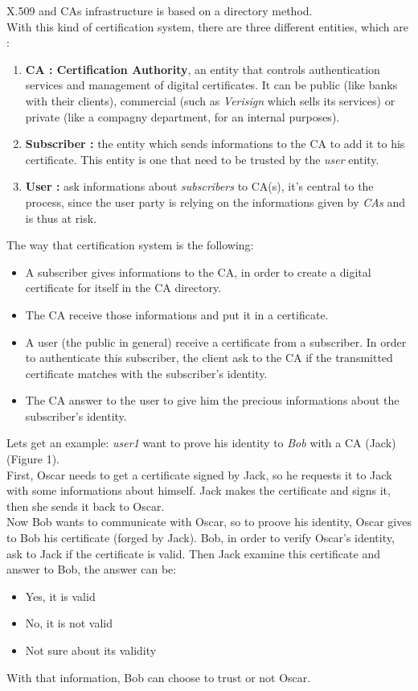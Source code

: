 \documentclass[journal, a4paper]{IEEEtran}
\begin{document}
X.509 and CAs\cite{rfc3647} infrastructure is based on a directory method.\\
With this kind of certification system, there are three different entities, which are :

\begin{enumerate}
	\item \textbf{CA : Certification Authority}, an entity that controls authentication services and management of digital certificates. It can be public (like banks with their clients), commercial (such as \textit{Verisign} which sells its services) or private (like a compagny department, for an internal purposes).
	\item \textbf{Subscriber :} the entity which sends informations to the CA to add it to his certificate. This entity is one that need to be trusted by the \textit{user} entity.
	\item \textbf{User :} ask informations about \textit{subscribers} to CA(s), it's central to the process, since the user party is relying on the informations given by \textit{CAs} and is thus at risk.
\end{enumerate}

The way that certification system is the following:
\begin{itemize}
	\item A subscriber gives informations to the CA, in order to create a digital certificate for itself in the CA directory.
	\item The CA receive those informations and put it in a certificate.
	\item A user (the public in general) receive a certificate from a subscriber. In order to authenticate this subscriber, the client ask to the CA if the transmitted certificate matches with the subscriber's identity.
	\item The CA answer to the user to give him the precious informations about the subscriber's identity.
\end{itemize}

Lets get an example: \textit{user1} want to prove his identity to \textit{Bob} with a CA (Jack) (Figure 1).\\
First, Oscar needs to get a certificate signed by Jack, so he requests it to Jack with some informations about himself. Jack makes the certificate and signs it, then she sends it back to Oscar.\\
Now Bob wants to communicate with Oscar, so to proove his identity, Oscar gives to Bob his certificate (forged by Jack). Bob, in order to verify Oscar's identity, ask to Jack if the certificate is valid. Then Jack examine this certificate and answer to Bob, the answer can be:
\begin{itemize}
	\item Yes, it is valid
	\item No, it is not valid
	\item Not sure about its validity
\end{itemize}
With that information, Bob can choose to trust or not Oscar.
\end{document}
